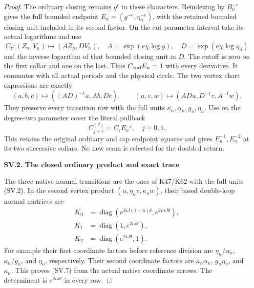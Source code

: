 \begin{proof}
The ordinary closing remains \(q^e\) in these characters.
Reindexing by \(B_n^{-e}\) gives the full bounded
endpoint \(E_n=(g^{-e},\eta_n^{-e})\), with the retained
bounded closing unit included in its second factor.
On the cut parameter interval take its actual
logarithms and use
\[
 C_\tau:(Z_n,V_n)\mapsto(AZ_n,DV_n),\quad
 A=\exp(e\chi\log g),\quad
 D=\exp(e\chi\log\eta_n)                              \tag{SV.4}
\]
and the inverse logarithm of that bounded closing
unit in \(D\). The cutoff is zero on the first collar
and one on the last. Thus \(C_{\rm end}E_n=1\)
with every derivative. It commutes with all actual
periods and the physical circle. The two vertex
chart expressions are exactly
\[
 (a,b,c)\mapsto((AD)^{-1}a,Ab,Dc),\qquad
 (u,v,w)\mapsto(ADu,D^{-1}v,A^{-1}w).
                                                        \tag{SV.5}
\]
They preserve every transition row with the full units
\(\kappa_n,\alpha_n,g_n,\eta_n\).
Use on the degree-two parameter cover the literal
pullback
\[
          C^{(2)}_{j+\tau}=C_\tau E_n^{-j},\quad j=0,1.
                                                        \tag{SV.6}
\]
This retains the original ordinary and cap endpoint
squares and gives \(E_n^{-1},E_n^{-2}\) at its two
successive collars. No new seam is selected for the
doubled return.

\par

\medskip\noindent\textbf{SV.2. The closed ordinary product and exact trace}

\par\nobreak

The three native normal transitions are the ones of
K47/K62 with the full units (SV.2). In the second
vertex product \((u,\eta_n v,\kappa_n w)\), their
based double-loop normal matrices are
\[
 \begin{aligned}
 K_0&=\operatorname{diag}
       (e^{2iJ(1-n)\theta},e^{2inJ\theta}),\\
 K_1&=\operatorname{diag}(1,e^{2iJ\theta}),\\
 K_2&=\operatorname{diag}(e^{2iJ\theta},1).
 \end{aligned}                                          \tag{SV.7}
\]
For example their first coordinate factors before
reference division are \(\eta_n/\alpha_n\),
\(\kappa_n/g_n\), and \(\eta_n\), respectively.
Their second coordinate factors are
\(\kappa_n\alpha_n\), \(g_n\eta_n\), and
\(\kappa_n\). This proves (SV.7) from the actual
native coordinate arrows. The determinant is
\(e^{2iJ\theta}\) in every row.


\end{proof}
